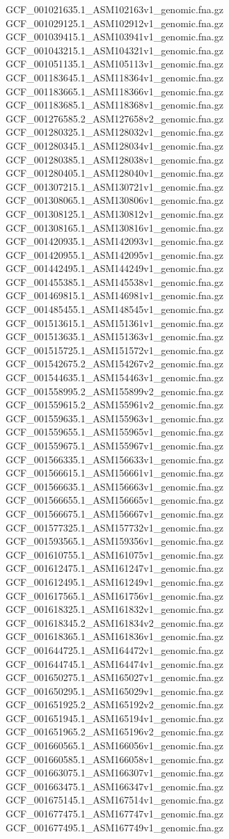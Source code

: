 \documentclass[12pt, letterpaper]{article}
\begin{document}
\begin{verbatim*}
GCF_001021635.1_ASM102163v1_genomic.fna.gz
GCF_001029125.1_ASM102912v1_genomic.fna.gz
GCF_001039415.1_ASM103941v1_genomic.fna.gz
GCF_001043215.1_ASM104321v1_genomic.fna.gz
GCF_001051135.1_ASM105113v1_genomic.fna.gz
GCF_001183645.1_ASM118364v1_genomic.fna.gz
GCF_001183665.1_ASM118366v1_genomic.fna.gz
GCF_001183685.1_ASM118368v1_genomic.fna.gz
GCF_001276585.2_ASM127658v2_genomic.fna.gz
GCF_001280325.1_ASM128032v1_genomic.fna.gz
GCF_001280345.1_ASM128034v1_genomic.fna.gz
GCF_001280385.1_ASM128038v1_genomic.fna.gz
GCF_001280405.1_ASM128040v1_genomic.fna.gz
GCF_001307215.1_ASM130721v1_genomic.fna.gz
GCF_001308065.1_ASM130806v1_genomic.fna.gz
GCF_001308125.1_ASM130812v1_genomic.fna.gz
GCF_001308165.1_ASM130816v1_genomic.fna.gz
GCF_001420935.1_ASM142093v1_genomic.fna.gz
GCF_001420955.1_ASM142095v1_genomic.fna.gz
GCF_001442495.1_ASM144249v1_genomic.fna.gz
GCF_001455385.1_ASM145538v1_genomic.fna.gz
GCF_001469815.1_ASM146981v1_genomic.fna.gz
GCF_001485455.1_ASM148545v1_genomic.fna.gz
GCF_001513615.1_ASM151361v1_genomic.fna.gz
GCF_001513635.1_ASM151363v1_genomic.fna.gz
GCF_001515725.1_ASM151572v1_genomic.fna.gz
GCF_001542675.2_ASM154267v2_genomic.fna.gz
GCF_001544635.1_ASM154463v1_genomic.fna.gz
GCF_001558995.2_ASM155899v2_genomic.fna.gz
GCF_001559615.2_ASM155961v2_genomic.fna.gz
GCF_001559635.1_ASM155963v1_genomic.fna.gz
GCF_001559655.1_ASM155965v1_genomic.fna.gz
GCF_001559675.1_ASM155967v1_genomic.fna.gz
GCF_001566335.1_ASM156633v1_genomic.fna.gz
GCF_001566615.1_ASM156661v1_genomic.fna.gz
GCF_001566635.1_ASM156663v1_genomic.fna.gz
GCF_001566655.1_ASM156665v1_genomic.fna.gz
GCF_001566675.1_ASM156667v1_genomic.fna.gz
GCF_001577325.1_ASM157732v1_genomic.fna.gz
GCF_001593565.1_ASM159356v1_genomic.fna.gz
GCF_001610755.1_ASM161075v1_genomic.fna.gz
GCF_001612475.1_ASM161247v1_genomic.fna.gz
GCF_001612495.1_ASM161249v1_genomic.fna.gz
GCF_001617565.1_ASM161756v1_genomic.fna.gz
GCF_001618325.1_ASM161832v1_genomic.fna.gz
GCF_001618345.2_ASM161834v2_genomic.fna.gz
GCF_001618365.1_ASM161836v1_genomic.fna.gz
GCF_001644725.1_ASM164472v1_genomic.fna.gz
GCF_001644745.1_ASM164474v1_genomic.fna.gz
GCF_001650275.1_ASM165027v1_genomic.fna.gz
GCF_001650295.1_ASM165029v1_genomic.fna.gz
GCF_001651925.2_ASM165192v2_genomic.fna.gz
GCF_001651945.1_ASM165194v1_genomic.fna.gz
GCF_001651965.2_ASM165196v2_genomic.fna.gz
GCF_001660565.1_ASM166056v1_genomic.fna.gz
GCF_001660585.1_ASM166058v1_genomic.fna.gz
GCF_001663075.1_ASM166307v1_genomic.fna.gz
GCF_001663475.1_ASM166347v1_genomic.fna.gz
GCF_001675145.1_ASM167514v1_genomic.fna.gz
GCF_001677475.1_ASM167747v1_genomic.fna.gz
GCF_001677495.1_ASM167749v1_genomic.fna.gz

\end{verbatim*}
\end{document}
